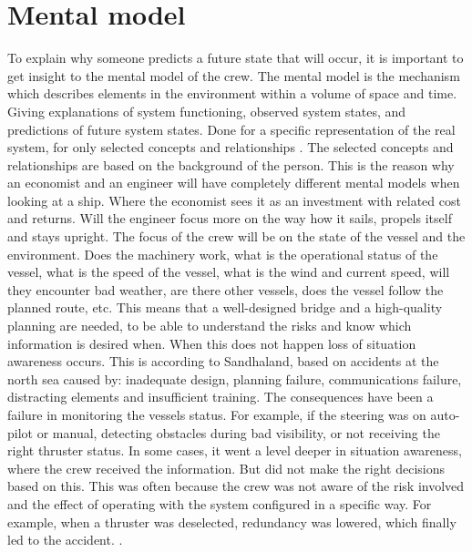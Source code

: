 \newpage
\section{Mental model}
To explain why someone predicts a future state that will occur, it is important to get insight to the mental model of the crew.
The mental model is the mechanism which describes elements in the environment within a volume of space and time. Giving explanations of system functioning, observed system states, and predictions of future system states. Done for a specific representation of the real system, for only selected concepts and relationships \cite{Kalloniatis2017}. 
The selected concepts and relationships are based on the background of the person. This is the reason why an economist and an engineer will have completely different mental models when looking at a ship. Where the economist sees it as an investment with related cost and returns. Will the engineer focus more on the way how it sails, propels itself and stays upright. 
The focus of the crew will be on the state of the vessel and the environment. Does the machinery work, what is the operational status of the vessel, what is the speed of the vessel, what is the wind and current speed, will they encounter bad weather, are there other vessels, does the vessel follow the planned route, etc. This means that a well-designed bridge and a high-quality planning are needed, to be able to understand the risks and know which information is desired when. 
When this does not happen loss of situation awareness occurs. This is according to Sandhaland, based on accidents at the north sea caused by: inadequate design, planning failure, communications failure, distracting elements and insufficient training. 
The consequences have been a failure in monitoring the vessels status. For example, if the steering was on auto-pilot or manual, detecting obstacles during bad visibility, or not receiving the right thruster status. In some cases, it went a level deeper in situation awareness, where the crew received the information. But did not make the right decisions based on this. This was often because the crew was not aware of the risk involved and the effect of operating with the system configured in a specific way. For example, when a thruster was deselected, redundancy was lowered, which finally led to the accident. \cite{Sandhaland2015}.

